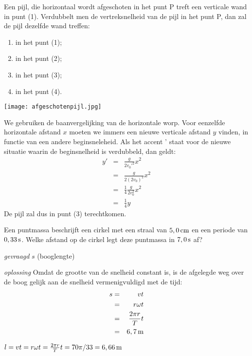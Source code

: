\documentclass{ximera}
\begin{document}
\begin{exercise} Een pijl, die horizontaal wordt afgeschoten in het punt P
treft een verticale wand in punt (1). Verdubbelt men de
vertreksnelheid van de pijl in het punt P, dan zal de pijl dezelfde
wand treffen:
\begin{enumerate}
\item in het punt (1);
\item in het punt (2);
\item in het punt (3);
\item in het punt (4).
\end{enumerate}
\begin{center}
\texttt{[image: afgeschotenpijl.jpg]}
\end{center}
\begin{oplossing}
We gebruiken de baanvergelijking van de
horizontale worp. Voor eenzelfde horizontale afstand $x$ moeten we
immers een nieuwe verticale afstand $y$ vinden, in functie van een
andere beginsneleheid. Als het accent ' staat voor de nieuwe
situatie waarin de beginsnelheid is verdubbeld, dan geldt:
\begin{eqnarray*}
y'&=&\frac{g}{2v_0'^2}x^2\\
&=&\frac{g}{2(2v_0)^2}x^2\\
&=&\frac{1}{4}\frac{g}{2v_0^2}x^2\\
&=&\frac{1}{4}y
\end{eqnarray*}
De pijl zal dus in punt (3) terechtkomen.
\end{oplossing}

\end{exercise}

\begin{exercise} Een puntmassa beschrijft een cirkel met een straal van $5,0\rm\,cm$ en een periode van $0,33\rm\,s$. Welke afstand op de cirkel legt deze puntmassa in $7,0\rm\,s$ af?
\begin{oplossing}
\textit{gevraagd}  $s$ (booglengte)

\textit{oplossing} Omdat de grootte van de snelheid constant is, is de
afgelegde weg over de boog gelijk aan de snelheid vermenigvuldigd met de tijd:
\begin{eqnarray*}
s&=&vt\\
&=&r\omega t\\
&=&\frac{2\pi r}{T}t\\
&=&6,7\rm\,m
\end{eqnarray*}
\end{oplossing}
\begin{oplossing}
$l=vt=r\omega t=\frac{2\pi r}{T}t=70\pi/33=6,66\rm\,m$
\end{oplossing}



\end{exercise}
\end{document}

